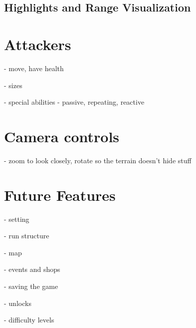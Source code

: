 \subsection{Highlights and Range Visualization}

\section{Attackers}

- move, have health

- sizes

- special abilities - passive, repeating, reactive

\section{Camera controls}

- zoom to look closely, rotate so the terrain doesn't hide stuff

\section{Future Features}

- setting

- run structure

- map

- events and shops

- saving the game

- unlocks

- difficulty levels
